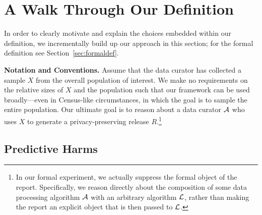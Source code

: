 \section{A Walk Through Our Definition}\label{sec:walkthrough}

In order to clearly motivate and explain the choices embedded within our definition, we incrementally build up our approach in this section; for the formal definition see Section~\ref{sec:formaldef}. 

\medskip\noindent
\textbf{Notation and Conventions.}
Assume that the data curator has collected a sample $X$ from the overall population of interest. We make no requirements on the relative sizes of $X$ and the population such that our framework can be used broadly---even in Census-like circumstances, in which the goal is to sample the entire population. Our ultimate goal is to reason about a data curator $\mathcal{A}$ who uses $X$ to generate a privacy-preserving release $R$.\footnote{In our formal experiment, we actually suppress the formal object of the report.  Specifically, we reason directly about the composition of some data processing algorithm $\mathcal{A}$ with an arbitrary algorithm $\mathcal{L}$, rather than making the report an explicit object that is then passed to $\mathcal{L}$.}

\subsection{Predictive Harms}\label{sec:incoherent-predictions}


